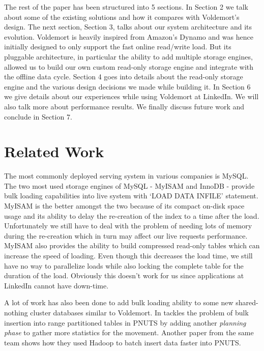 \documentclass[10pt,twocolumn,preprint,natbib,authoryear]{sigplanconf}
\begin{document}
The rest of the paper has been structured into 5 sections. In Section 2 we talk about some of the existing solutions and how it compares with Voldemort's design. The next section, Section 3,  talks about our system architecture and its evolution. Voldemort is heavily inspired from Amazon's Dynamo\cite{5} and was hence initially designed to only support the fast online read/write load. But its pluggable architecture, in particular the ability to add multiple storage engines, allowed us to build our own custom read-only storage engine and integrate with the offline data cycle. Section 4 goes into details about the read-only storage engine and the various design decisions we made while building it. In Section 6 we give details about our experiences while using Voldemort at LinkedIn. We will also talk more about performance results. We finally discuss future work and conclude in Section 7. 


\section{Related Work}
The most commonly deployed serving system in various companies is MySQL. The two most used storage engines of MySQL - MyISAM and InnoDB - provide bulk loading capabilities into live system with `LOAD DATA INFILE' statement. MyISAM is the better amongst the two because of its compact on-disk space usage and its ability to delay the re-creation of the index to a time after the load\cite{6 - http://dev.mysql.com/doc/refman/5.5/en/optimizing-myisam-bulk-data-loading.html}.  Unfortunately we still have to deal with the problem of needing lots of memory during the re-creation which in turn may affect our live requests performance. MyISAM also provides the ability to build compressed read-only tables \cite{7 - http://dev.mysql.com/doc/refman/5.5/en/myisampack.html} which can increase the speed of loading. Even though this decreases the load time, we still have no way to parallelize loads while also locking the complete table for the duration of the load. Obviously this doesn't work for us since applications at LinkedIn cannot have down-time. 

A lot of work has also been done to add bulk loading ability to some new shared-nothing cluster\cite{The Case for Shared Nothing Database} databases similar to Voldemort. In \cite{8 - Efﬁcient Bulk Insertion into a Distributed Ordered Table} tackles the problem of bulk insertion into range partitioned tables in PNUTS \cite{9 - PNUTS paper} by adding another \emph {planning phase} to gather more statistics for the movement. Another paper from the same team \cite{A Batch of PNUTS: Experiences Connecting Cloud Batch and Serving Systems} shows how they used Hadoop to batch insert data faster into PNUTS.
\end{document}

